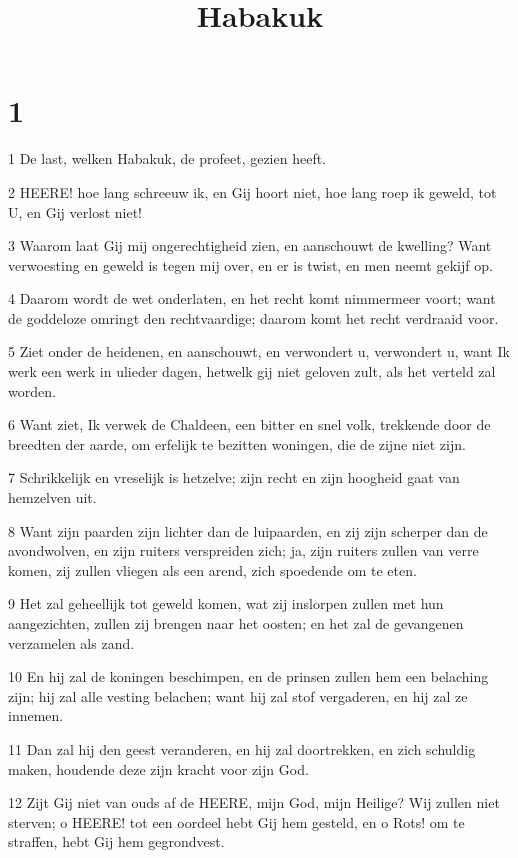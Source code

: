 

\title{Habakuk}



\chapter{1}

\par 1 De last, welken Habakuk, de profeet, gezien heeft.
\par 2 HEERE! hoe lang schreeuw ik, en Gij hoort niet, hoe lang roep ik geweld, tot U, en Gij verlost niet!
\par 3 Waarom laat Gij mij ongerechtigheid zien, en aanschouwt de kwelling? Want verwoesting en geweld is tegen mij over, en er is twist, en men neemt gekijf op.
\par 4 Daarom wordt de wet onderlaten, en het recht komt nimmermeer voort; want de goddeloze omringt den rechtvaardige; daarom komt het recht verdraaid voor.
\par 5 Ziet onder de heidenen, en aanschouwt, en verwondert u, verwondert u, want Ik werk een werk in ulieder dagen, hetwelk gij niet geloven zult, als het verteld zal worden.
\par 6 Want ziet, Ik verwek de Chaldeen, een bitter en snel volk, trekkende door de breedten der aarde, om erfelijk te bezitten woningen, die de zijne niet zijn.
\par 7 Schrikkelijk en vreselijk is hetzelve; zijn recht en zijn hoogheid gaat van hemzelven uit.
\par 8 Want zijn paarden zijn lichter dan de luipaarden, en zij zijn scherper dan de avondwolven, en zijn ruiters verspreiden zich; ja, zijn ruiters zullen van verre komen, zij zullen vliegen als een arend, zich spoedende om te eten.
\par 9 Het zal geheellijk tot geweld komen, wat zij inslorpen zullen met hun aangezichten, zullen zij brengen naar het oosten; en het zal de gevangenen verzamelen als zand.
\par 10 En hij zal de koningen beschimpen, en de prinsen zullen hem een belaching zijn; hij zal alle vesting belachen; want hij zal stof vergaderen, en hij zal ze innemen.
\par 11 Dan zal hij den geest veranderen, en hij zal doortrekken, en zich schuldig maken, houdende deze zijn kracht voor zijn God.
\par 12 Zijt Gij niet van ouds af de HEERE, mijn God, mijn Heilige? Wij zullen niet sterven; o HEERE! tot een oordeel hebt Gij hem gesteld, en o Rots! om te straffen, hebt Gij hem gegrondvest.
